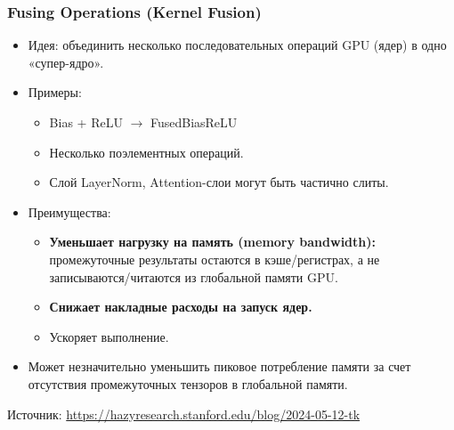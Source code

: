 \begin{frame}
  \frametitle{Fusing Operations (Kernel Fusion)}
  \begin{itemize}
    \item Идея: объединить несколько последовательных операций GPU (ядер) в одно «супер-ядро».
    \item Примеры:
      \begin{itemize}
        \item Bias + ReLU $\rightarrow$ FusedBiasReLU
        \item Несколько поэлементных операций.
        \item Слой LayerNorm, Attention-слои могут быть частично слиты.
      \end{itemize}
    \item Преимущества:
      \begin{itemize}
        \item \textbf{Уменьшает нагрузку на память (memory bandwidth):} промежуточные результаты остаются в кэше/регистрах, а не записываются/читаются из глобальной памяти GPU.
        \item \textbf{Снижает накладные расходы на запуск ядер.}
        \item Ускоряет выполнение.
      \end{itemize}
    \item Может незначительно уменьшить пиковое потребление памяти за счет отсутствия промежуточных тензоров в глобальной памяти.
  \end{itemize}
  \vspace{0.5cm}
  \begin{flushright}
    \tiny Источник: \url{https://hazyresearch.stanford.edu/blog/2024-05-12-tk}
  \end{flushright}
\end{frame}

